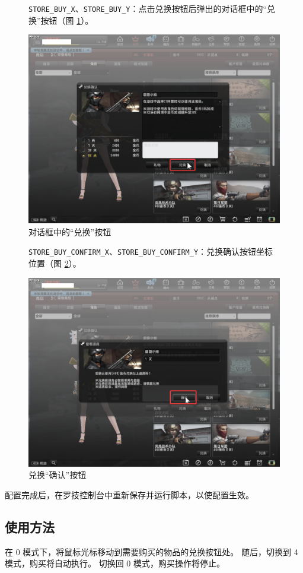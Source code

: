 \begin{figure}[H]
    \Centering
    \parbox[l]{\textwidth}{\lstinline{STORE_BUY_X}、\lstinline{STORE_BUY_Y}：点击兑换按钮后弹出的对话框中的“兑换”按钮（图 \ref{ch4fig-store-purchase}）。}
    \includegraphics[width=\textwidth]{docs/assets/store_purchase.png}
    \caption{对话框中的“兑换”按钮}
    \label{ch4fig-store-purchase}
\end{figure}
\clearpage

\begin{figure}[H]
    \Centering
    \parbox[l]{\textwidth}{\lstinline{STORE_BUY_CONFIRM_X}、\lstinline{STORE_BUY_CONFIRM_Y}：兑换确认按钮坐标位置（图 \ref{ch4fig-buy-confirm}）。}
    \includegraphics[width=\textwidth]{docs/assets/store_buy_confirm.png}
    \caption{兑换“确认”按钮}
    \label{ch4fig-buy-confirm}
\end{figure}
\clearpage

配置完成后，在罗技控制台中重新保存并运行脚本，以使配置生效。

\subsection{使用方法}

在 0 模式下，将鼠标光标移动到需要购买的物品的兑换按钮处。
随后，切换到 4 模式，购买将自动执行。
切换回 0 模式，购买操作将停止。
